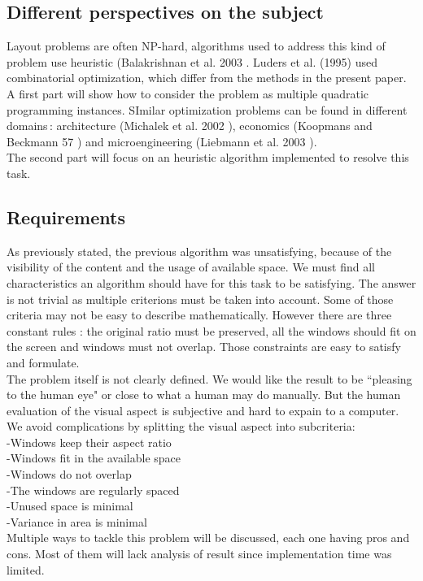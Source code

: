 \documentclass{acmtog}
\begin{document}
\subsection{Different perspectives on the subject}
Layout problems are often NP-hard, algorithms used to address this kind of problem use heuristic (Balakrishnan et al. 2003 \cite{balakrishnan2003facopt}. Luders et al. (1995) \cite{luders1995approach} used combinatorial optimization, which differ from the methods in the present paper. \\
A first part will show how to consider the problem as multiple quadratic programming instances. SImilar optimization problems can be found in different domains\,: architecture (Michalek et al. 2002 \cite{michalek2002architectural}), economics (Koopmans and Beckmann 57 \cite{Koopmans57}) and microengineering (Liebmann et al. 2003 \cite{liebmann2003layout}). \\
The second part will focus on an heuristic algorithm implemented to resolve this task.

\subsection{Requirements}
As previously stated, the previous algorithm was unsatisfying, because of the visibility of the content and the usage of available space. We must find all characteristics  an algorithm should have for this task to be satisfying. The answer is not trivial as multiple criterions must be taken into account. Some of those criteria  may not be easy to describe mathematically. However there are three constant rules : the original ratio must be preserved, all the windows should fit on the screen and windows must not overlap. Those constraints are easy to satisfy and formulate.\\
The problem itself is not clearly defined. We would like the result to be ``pleasing to the human eye" or close to what a human may do manually. But the human evaluation of the visual aspect is subjective and hard to expain to a computer. We avoid complications by splitting the visual aspect into subcriteria:\\
-Windows keep their aspect ratio\\
-Windows fit in the available space\\
-Windows do not overlap \\
-The windows are regularly spaced \\
-Unused space is minimal\\
-Variance in area is minimal\\
Multiple ways to tackle this problem will be discussed, each one having pros and cons. Most of them will lack analysis of result since implementation time was limited. 
\end{document}
